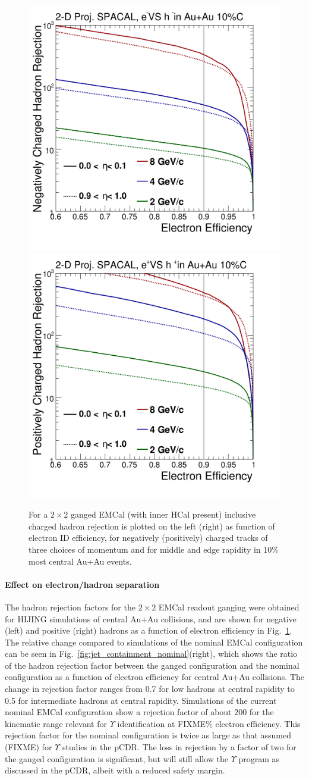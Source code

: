 \begin{figure}[hbt]
  \centering
  \includegraphics[width=0.4\linewidth]{figs/DrawEcal_Likelihood_Sum_RejectionCurve_AuAuSummary}
  \hspace{0.1\linewidth}
  \includegraphics[width=0.4\linewidth]{figs/DrawEcal_Likelihood_Sum_RejectionCurve_AuAuSummaryPos}
  \caption{For a $2\times2$ ganged EMCal (with inner HCal present)
    inclusive charged hadron rejection is plotted on the left (right)
    as function of electron ID efficiency, for negatively (positively)
    charged tracks of three choices of momentum and for middle and
    edge rapidity in 10\% most central Au+Au events.}
  \label{fig:eid_auau}
\end{figure}

\paragraph{Effect on electron/hadron separation}

The hadron rejection factors  for the $2\times 2$ EMCal readout ganging were obtained for HIJING simulations of central Au+Au collisions, and are
shown for negative (left) and positive (right) hadrons as a function of electron efficiency in Fig.~\ref{fig:eid_auau}. 
The relative change compared to simulations of the nominal EMCal configuration can be seen in Fig.~\ref{fig:jet_containment_nominal}(right), which shows
the ratio of the hadron rejection factor between the ganged configuration and the nominal configuration as a function
of electron efficiency for central Au+Au collisions. The change in rejection factor ranges from 0.7 for low \pt hadrons
at central rapidity to 0.5 for intermediate \pt hadrons at central rapidity. Simulations of the current nominal EMCal 
configuration show a rejection factor of about 200 for the kinematic range relevant for $\Upsilon$ identification at FIXME\%
electron efficiency. This rejection factor for the nominal configuration is twice as large as that assumed (FIXME) 
for $\Upsilon$ studies in the pCDR. The loss in rejection by a factor of two for the ganged configuration is significant, but
will still allow the $\Upsilon$ program as discussed in the pCDR, albeit with a reduced safety margin.

